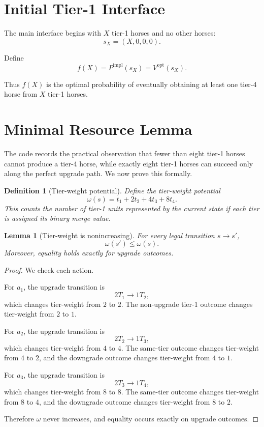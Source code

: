 \documentclass[11pt]{article}
\newtheorem{lemma}[theorem]{Lemma}
\newtheorem{definition}[theorem]{Definition}
\newcommand{\weight}{\omega}
\newcommand{\impl}{\mathrm{impl}}
\newcommand{\opt}{\mathrm{opt}}
\begin{document}
\section{Initial Tier-1 Interface}

The main interface begins with \(X\) tier-1 horses and no other horses:
\[
    s_X=(X,0,0,0).
\]

Define
\[
    f(X)=P^\impl(s_X)=V^\opt(s_X).
\]

Thus \(f(X)\) is the optimal probability of eventually obtaining at least one tier-4 horse from \(X\) tier-1 horses.

\section{Minimal Resource Lemma}

The code records the practical observation that fewer than eight tier-1 horses cannot produce a tier-4 horse, while exactly eight tier-1 horses can succeed only along the perfect upgrade path.  We now prove this formally.

\begin{definition}[Tier-weight potential]
Define the tier-weight potential
\[
    \weight(s)=t_1+2t_2+4t_3+8t_4.
\]
This counts the number of tier-1 units represented by the current state if each tier is assigned its binary merge value.
\end{definition}

\begin{lemma}[Tier-weight is nonincreasing]
For every legal transition \(s\to s'\),
\[
    \weight(s')\le \weight(s).
\]
Moreover, equality holds exactly for upgrade outcomes.
\end{lemma}

\begin{proof}
We check each action.

For \(a_1\), the upgrade transition is
\[
    2T_1\to 1T_2,
\]
which changes tier-weight from \(2\) to \(2\).  The non-upgrade tier-1 outcome changes tier-weight from \(2\) to \(1\).

For \(a_2\), the upgrade transition is
\[
    2T_2\to 1T_3,
\]
which changes tier-weight from \(4\) to \(4\).  The same-tier outcome changes tier-weight from \(4\) to \(2\), and the downgrade outcome changes tier-weight from \(4\) to \(1\).

For \(a_3\), the upgrade transition is
\[
    2T_3\to 1T_4,
\]
which changes tier-weight from \(8\) to \(8\).  The same-tier outcome changes tier-weight from \(8\) to \(4\), and the downgrade outcome changes tier-weight from \(8\) to \(2\).

Therefore \(\weight\) never increases, and equality occurs exactly on upgrade outcomes.
\end{proof}
\end{document}
